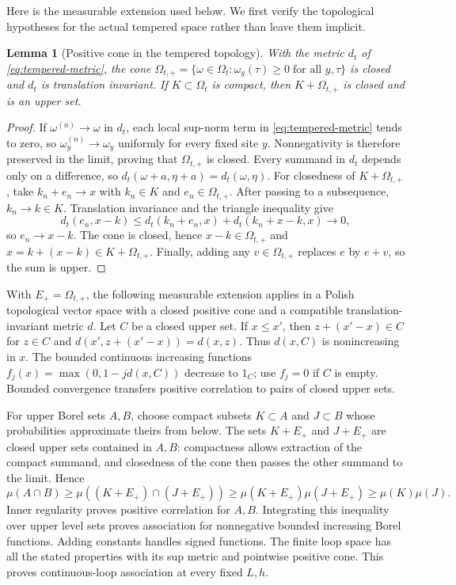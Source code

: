 \documentclass[11pt]{article}
\numberwithin{equation}{section}
\newtheorem{lemma}[theorem]{Lemma}
\theoremstyle{definition}
\begin{document}
Here is the measurable extension used below. We first verify the topological
hypotheses for the actual tempered space rather than leave them implicit.
\begin{lemma}[Positive cone in the tempered topology]
\label{lem:positive-cone-topology}
With the metric $d_t$ of \eqref{eq:tempered-metric}, the cone
$\Omega_{t,+}=\{\omega\in\Omega_t:\omega_y(\tau)\geq0\;\text{for all }y,\tau\}$ is closed and $d_t$ is translation invariant. If
$K\subset\Omega_t$ is compact, then $K+\Omega_{t,+}$ is closed and is an
upper set.
\end{lemma}
\begin{proof}
If $\omega^{(n)}\to\omega$ in $d_t$, each local sup-norm term in
\eqref{eq:tempered-metric} tends to zero, so
$\omega^{(n)}_y\to\omega_y$ uniformly for every fixed site $y$.
Nonnegativity is therefore preserved in the limit, proving that
$\Omega_{t,+}$ is closed. Every summand in $d_t$ depends only on a
difference, so $d_t(\omega+a,\eta+a)=d_t(\omega,\eta)$.
For closedness of $K+\Omega_{t,+}$, take
$k_n+e_n\to x$ with $k_n\in K$ and $e_n\in\Omega_{t,+}$. After passing to
a subsequence, $k_n\to k\in K$. Translation invariance and the triangle
inequality give
\[
d_t(e_n,x-k)\leq d_t(k_n+e_n,x)+d_t(k_n+x-k,x)\longrightarrow0,
\]
so $e_n\to x-k$. The cone is closed, hence $x-k\in\Omega_{t,+}$ and
$x=k+(x-k)\in K+\Omega_{t,+}$. Finally, adding any
$v\in\Omega_{t,+}$ replaces $e$ by $e+v$, so the sum is upper.
\end{proof}

With $E_+=\Omega_{t,+}$, the following measurable extension applies in a
Polish topological vector space with a closed positive cone and a compatible
translation-invariant metric $d$. Let $C$ be a closed upper set.
If $x\leq x'$, then
$z+(x'-x)\in C$ for $z\in C$ and
$d(x',z+(x'-x))=d(x,z)$. Thus $d(x,C)$ is nonincreasing in $x$.
The bounded continuous increasing functions
$f_j(x)=\max(0,1-jd(x,C))$ decrease to $1_C$; use $f_j=0$ if $C$ is empty.
Bounded convergence transfers positive correlation to pairs of closed upper
sets.

For upper Borel sets $A,B$, choose compact subsets $K\subset A$ and
$J\subset B$ whose probabilities approximate theirs from below.  The sets
$K+E_+$ and $J+E_+$ are closed upper sets contained in $A,B$:
compactness allows extraction of the compact summand, and closedness of
the cone then passes the other summand to the limit.  Hence
\[
 \mu(A\cap B)\geq\mu((K+E_+)\cap(J+E_+))
 \geq\mu(K+E_+)\mu(J+E_+)\geq\mu(K)\mu(J).
\]
Inner regularity proves positive correlation for $A,B$. Integrating this
inequality over upper level sets proves association for nonnegative bounded
increasing Borel functions. Adding constants handles signed functions.
The finite loop space has all the stated properties with its sup metric
and pointwise positive cone. This proves continuous-loop association at
every fixed $L,h$.
\end{document}
